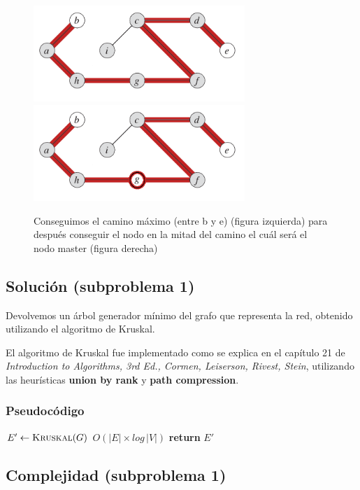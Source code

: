 \documentclass[a4paper, 10pt, twoside]{article}
\newenvironment{pseudo}[1][]{%
    \vspace{1em}%
    \begin{algorithmic}%
}
{%
    \end{algorithmic}%
    \vspace{1em}%
}
\newcommand{\PReturn}{\State \textbf{return} }
\newcommand{\Ode}[1]{\hfill $O(#1)$}
\begin{document}
\begin{figure}[H]
\includegraphics[width=80mm]{ej2aCMax.png}
\includegraphics[width=80mm]{ej2aMaster.png}
\caption{Conseguimos el camino máximo (entre b y e) (figura izquierda) para después conseguir el nodo en la mitad del camino el cuál será el nodo master (figura derecha)}
\label{overflow}
\end{figure}  

\subsection{Solución (subproblema 1)}

Devolvemos un árbol generador mínimo del grafo que representa la red, obtenido utilizando el algoritmo de Kruskal.

El algoritmo de Kruskal fue implementado como se explica en el capítulo 21 de \textit{Introduction to Algorithms, 3rd Ed., Cormen, Leiserson, Rivest, Stein}, utilizando las heurísticas \textbf{union by rank} y \textbf{path compression}.


\subsubsection{Pseudocódigo}

\begin{pseudo}
    \State $E' \leftarrow \textsc{Kruskal}(G)$                 \Ode{|E| \times log\, |V|}
    \PReturn $E'$
  \EndProcedure
\end{pseudo}


\subsection{Complejidad (subproblema 1)}
\end{document}
